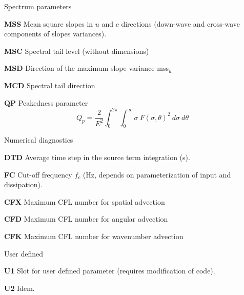 \begin{list}{)\hfill}
\item{Spectrum parameters}

\begin{list}{)\hfill}
            { \leftmargin 8mm 
             \rightmargin 0mm \itemsep 0mm \parsep 0mm}

\item \textbf{MSS} Mean square slopes in $u$ and $c$ directions (down-wave and cross-wave components of slopes variances). 
\item \textbf{MSC} Spectral tail level (without dimensions) 
\item \textbf{MSD} Direction of the maximum slope variance mss$_u$
\item \textbf{MCD} Spectral tail direction
\item \textbf{QP}  Peakedness parameter \citep{art:G70}
      \begin{equation} Q_p = \frac{2}{E^2} \int_0^{2\pi} \int_0^\infty
      \sigma\:F(\sigma,\theta)^2\:d\sigma\:d\theta \: \label{eq:qp}
      \end{equation}
\end{list}

\item{Numerical diagnostics }

\begin{list}{)\hfill}
            { \leftmargin 8mm 
             \rightmargin 0mm \itemsep 0mm \parsep 0mm}
\item \textbf{DTD} Average time step in the source term integration (s).
\item \textbf{FC} Cut-off frequency $f_c$ (Hz, depends on parameterization of
      input and dissipation).
\item \textbf{CFX} Maximum CFL number for spatial advection 
\item \textbf{CFD} Maximum CFL number for angular advection 
\item \textbf{CFK} Maximum CFL number for wavenumber advection 
\end{list}

\item{User defined }

\begin{list}{)\hfill}
            { \leftmargin 8mm 
             \rightmargin 0mm \itemsep 0mm \parsep 0mm}

\item \textbf{U1} Slot for user defined parameter (requires modification of code).
\item \textbf{U2} Idem.
\end{list}

\end{list}




